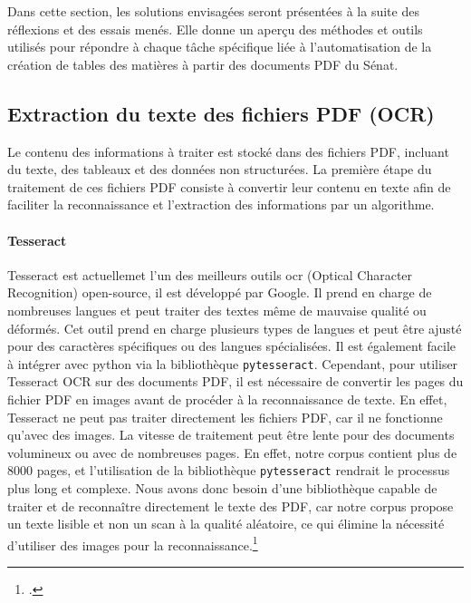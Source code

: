 Dans cette section, les solutions envisagées seront présentées à la suite des réflexions et des essais menés. Elle donne un aperçu des méthodes et outils utilisés pour répondre à chaque tâche spécifique liée à l’automatisation de la création de tables des matières à partir des documents \gls{PDF} du Sénat.

\subsection{Extraction du texte des fichiers PDF (OCR)}

Le contenu des informations à traiter est stocké dans des fichiers \gls{PDF}, incluant du texte, des tableaux et des données non structurées. La première étape du traitement de ces fichiers \gls{PDF} consiste à convertir leur contenu en texte afin de faciliter la reconnaissance et l’extraction des informations par un algorithme.

\paragraph{Tesseract}  
\gls{Tesseract} est actuellemet l'un des meilleurs outils \gls{ocr} (Optical Character Recognition) \gls{open-source}, il est développé par Google. Il prend en charge de nombreuses langues et peut traiter des textes même de mauvaise qualité ou déformés. Cet outil prend en charge plusieurs types de langues et peut être ajusté pour des caractères spécifiques ou des langues spécialisées. Il est également facile à intégrer avec \gls{python} via la bibliothèque \texttt{pytesseract}. Cependant, pour utiliser \gls{Tesseract} \gls{OCR} sur des documents \gls{PDF}, il est nécessaire de convertir les pages du fichier \gls{PDF} en images avant de procéder à la reconnaissance de texte. En effet, \gls{Tesseract} ne peut pas traiter directement les fichiers \gls{PDF}, car il ne fonctionne qu'avec des images. La vitesse de traitement peut être lente pour des documents volumineux ou avec de nombreuses pages. En effet, notre corpus contient plus de 8000 pages, et l'utilisation de la bibliothèque \texttt{pytesseract} rendrait le processus plus long et complexe. Nous avons donc besoin d'une \gls{bibliothèque} capable de traiter et de reconnaître directement le texte des \gls{PDF}, car notre corpus propose un texte lisible et non un scan à la qualité aléatoire, ce qui élimine la nécessité d'utiliser des images pour la reconnaissance.\footcite{tesseract_ocr_docs}

